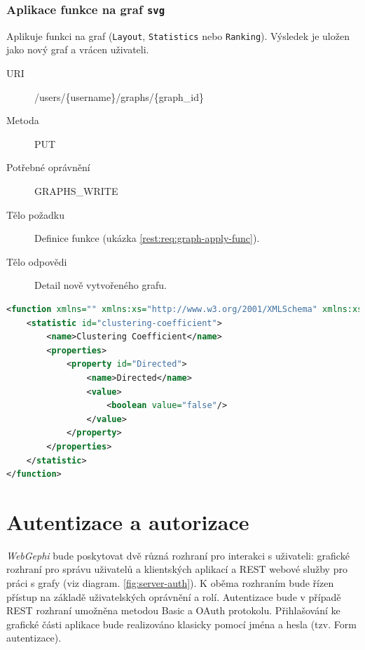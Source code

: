 \documentclass[thesis=M,czech]{FITthesis}[2014/05/6]
\begin{document}
\subsubsection{Aplikace funkce na graf \texttt{svg}}
Aplikuje funkci na graf (\texttt{Layout}, \texttt{Statistics} nebo \texttt{Ranking}). Výsledek je uložen jako nový graf a vrácen uživateli. 
\begin{description}
  \item[URI] /users/\{username\}/graphs/\{graph\_id\}
  \item[Metoda] PUT
  \item[Potřebné oprávnění] GRAPHS\_WRITE
  \item[Tělo požadku] Definice funkce (ukázka \ref{rest:req:graph-apply-func}).
  \item[Tělo odpovědi] Detail nově vytvořeného grafu. 
\end{description}


\begin{lstlisting}[caption=Tělo požadavku zdroje /users/\{username\}/graphs/\{graph\_id\} (PUT), label=rest:req:graph-apply-func, language=xml]
<function xmlns="" xmlns:xs="http://www.w3.org/2001/XMLSchema" xmlns:xsi="http://www.w3.org/2001/XMLSchema-instance">
    <statistic id="clustering-coefficient">
        <name>Clustering Coefficient</name>
		<properties>
			<property id="Directed">
				<name>Directed</name>
				<value>
					<boolean value="false"/>
				</value>
			</property>
		</properties>
    </statistic>
</function>
\end{lstlisting}  

\section{Autentizace a autorizace}\label{roles}
\textit{WebGephi} bude poskytovat dvě různá rozhraní pro interakci s uživateli:
grafické rozhraní pro správu uživatelů a klientských aplikací a REST webové služby pro práci s grafy (viz diagram. \ref{fig:server-auth}).
K oběma rozhraním bude řízen přístup na základě uživatelských oprávnění a rolí. Autentizace bude v případě REST rozhraní umožněna metodou Basic a OAuth protokolu.
Přihlašování ke grafické části aplikace bude realizováno klasicky pomocí jména a hesla (tzv. Form autentizace).
\end{document}
